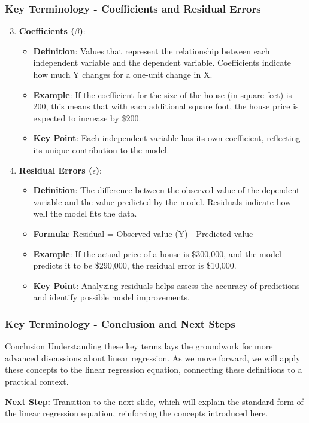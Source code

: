 \documentclass{beamer}
\begin{document}
\begin{frame}[fragile]
    \frametitle{Key Terminology - Coefficients and Residual Errors}
    \begin{enumerate}
        \setcounter{enumi}{2}
        \item \textbf{Coefficients ($\beta$)}:
            \begin{itemize}
                \item \textbf{Definition}: Values that represent the relationship between each independent variable and the dependent variable. Coefficients indicate how much Y changes for a one-unit change in X.
                \item \textbf{Example}: If the coefficient for the size of the house (in square feet) is 200, this means that with each additional square foot, the house price is expected to increase by \$200.
                \item \textbf{Key Point}: Each independent variable has its own coefficient, reflecting its unique contribution to the model.
            \end{itemize}
        \item \textbf{Residual Errors ($\epsilon$)}:
            \begin{itemize}
                \item \textbf{Definition}: The difference between the observed value of the dependent variable and the value predicted by the model. Residuals indicate how well the model fits the data.
                \item \textbf{Formula}: Residual = Observed value (Y) - Predicted value
                \item \textbf{Example}: If the actual price of a house is \$300,000, and the model predicts it to be \$290,000, the residual error is \$10,000.
                \item \textbf{Key Point}: Analyzing residuals helps assess the accuracy of predictions and identify possible model improvements.
            \end{itemize}
    \end{enumerate}
\end{frame}

\begin{frame}[fragile]
    \frametitle{Key Terminology - Conclusion and Next Steps}
    \begin{block}{Conclusion}
        Understanding these key terms lays the groundwork for more advanced discussions about linear regression. 
        As we move forward, we will apply these concepts to the linear regression equation, connecting these definitions to a practical context.
    \end{block}
    
    \vspace{1em}
    
    \textbf{Next Step:}
    Transition to the next slide, which will explain the standard form of the linear regression equation, reinforcing the concepts introduced here.
\end{frame}
\end{document}

